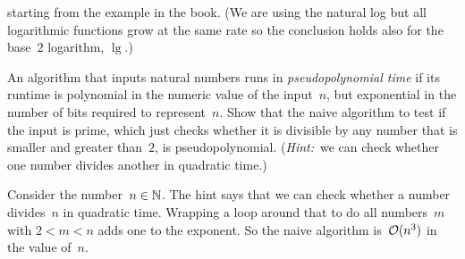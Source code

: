 \documentclass[answers, nolegalese, 11pt]{examjh}
\begin{document}
\begin{questions}
starting from the example in the book.
(We are using the natural log but all logarithmic functions grow at the
same rate so the conclusion holds also for the base~$2$ logarithm, $\lg$.)
\begin{solution}
\end{solution}

\question
An algorithm that inputs natural numbers runs in 
\textit{pseudopolynomial time}
if its runtime is polynomial in the numeric value of the input~$n$, 
but exponential in the number of bits required to represent~$n$.   
Show that the naive algorithm to test if the input is prime,
which just checks whether it is divisible by any number
that is smaller and greater than~$2$, 
is pseudopolynomial.
(\textit{Hint:}~we can check whether one number divides another in quadratic time.) 
\begin{solution}
Consider the number~$n\in\mathbb{N}$.
The hint says that we can check whether a number divides~$n$ in
quadratic time.
Wrapping a loop around that to do all numbers~$m$ with $2<m<n$ adds
one to the exponent.
So the naive algorithm is~$\operatorname*{\mathcal{O}}(n^3)$ in the value of~$n$.


\end{solution}
\end{questions}
\end{document}
